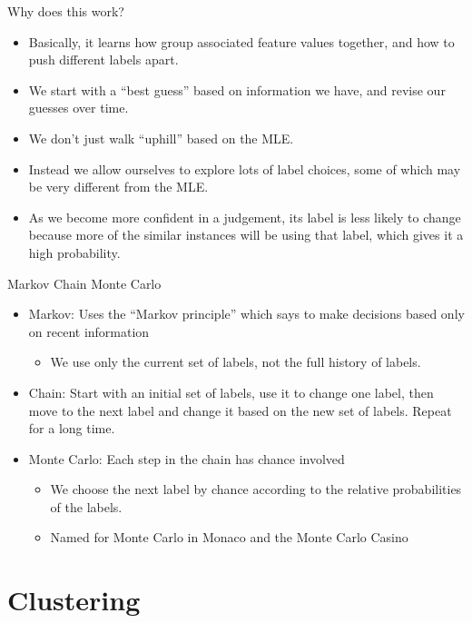 \documentclass[11pt,letterpaper]{article}
\begin{document}
Why does this work?

\begin{itemize}
  \item Basically, it learns how group associated feature values together, and how to push different labels apart.
  \item We start with a ``best guess'' based on information we have, and revise our guesses over time.
  \item We don't just walk ``uphill'' based on the MLE.  
  \item Instead we allow ourselves to explore lots of label choices, some of which may be very different from the MLE.
  \item As we become more confident in a judgement, its label is less likely to change because more of the similar instances will be using that label, which gives it a high probability.
\end{itemize}

Markov Chain Monte Carlo

\begin{itemize}
  \item Markov: Uses the ``Markov principle'' which says to make decisions based only on recent information
    \begin{itemize}
      \item We use only the current set of labels, not the full history of labels.
    \end{itemize}
  \item Chain: Start with an initial set of labels, use it to change one label, then move to the next label and change it based on the new set of labels.  Repeat for a long time.
  \item Monte Carlo: Each step in the chain has chance involved
    \begin{itemize}
      \item We choose the next label by chance according to the relative probabilities of the labels.
      \item Named for Monte Carlo in Monaco and the Monte Carlo Casino
    \end{itemize}
\end{itemize}






\section{Clustering}
\end{document}
